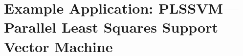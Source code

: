\section{Example Application: PLSSVM---Parallel Least Squares Support Vector Machine}
\label{sec:blas:plssvm}





